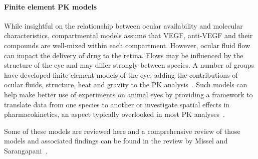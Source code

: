 \documentclass{article}
\begin{document}

\paragraph*{Finite element PK models}

While insightful on the relationship between ocular availability and molecular characteristics, compartmental models assume that VEGF, anti-VEGF and their compounds are well-mixed within each compartment.
However, ocular fluid flow can impact the delivery of drug to the retina.
Flows may be influenced by the structure of the eye and may differ strongly between species.
A number of groups have developed finite element models of the eye, adding the contributions of ocular fluids, structure, heat and gravity to the PK analysis~\cite{Lamminsalo_2018, Missel_2012, Zhang_2018}.
Such models can help make better use of experiments on animal eyes by providing a framework to translate data from one species to another or investigate spatial effects in pharmacokinetics, an aspect typically overlooked in most PK analyses~\cite{Bakri_2007, Caruso_2020, HuttonSmith_2016,HuttonSmith_2017,HuttonSmith_2018, Kaiser_2019, Park_2015, Park_2016, Xu_2013}.

Some of these models are reviewed here and a comprehensive review of those models and associated findings can be found in the review by Missel and Sarangapani~\cite{Missel_2019}.
\end{document}
